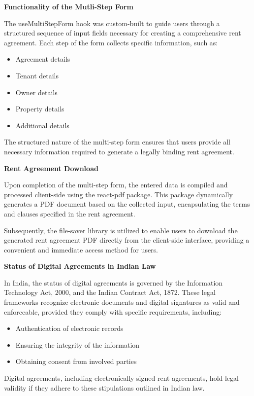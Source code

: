 \noindent
\textbf{Functionality of the Mutli-Step Form}\par\medskip\noindent
The useMultiStepForm hook was custom-built to guide users through a structured sequence of input fields necessary for creating a comprehensive rent agreement. Each step of the form collects specific information, such as:

\begin{itemize}
    \item Agreement details
    \item Tenant details
    \item Owner details
    \item Property details
    \item Additional details
\end{itemize}
\noindent
The structured nature of the multi-step form ensures that users provide all necessary information required to generate a legally binding rent agreement.

\medskip
\noindent
\textbf{Rent Agreement Download}\par\medskip\noindent
Upon completion of the multi-step form, the entered data is compiled and processed client-side using the react-pdf package. This package dynamically generates a PDF document based on the collected input, encapsulating the terms and clauses specified in the rent agreement.\par\medskip

Subsequently, the file-saver library is utilized to enable users to download the generated rent agreement PDF directly from the client-side interface, providing a convenient and immediate access method for users.

\medskip
\noindent
\textbf{Status of Digital Agreements in Indian Law}\par\medskip\noindent
In India, the status of digital agreements is governed by the Information Technology Act, 2000, and the Indian Contract Act, 1872. These legal frameworks recognize electronic documents and digital signatures as valid and enforceable, provided they comply with specific requirements, including:

\begin{itemize}
    \item Authentication of electronic records
    \item Ensuring the integrity of the information
    \item Obtaining consent from involved parties
\end{itemize}
Digital agreements, including electronically signed rent agreements, hold legal validity if they adhere to these stipulations outlined in Indian law.

